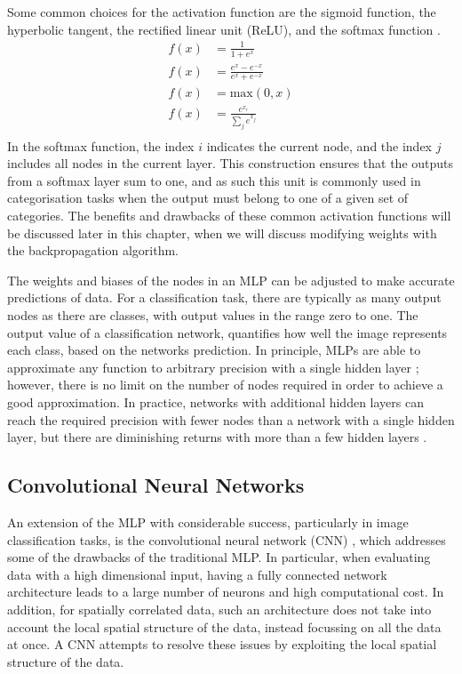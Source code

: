 Some common choices for the activation function are the sigmoid function, the
hyperbolic tangent, the rectified linear unit (ReLU), and the softmax function
\cite{Lecun2015, He2015, Szegedy2015}.
\begin{align}
	\tag{Sigmoid} f(x) &= \frac{1}{1+e^x} \\
	\tag{Tanh}    f(x) &= \frac{e^x - e^{-x}}{e^x+e^{-x}} \\
	\tag{ReLU}    f(x) &= \mbox{max}\left( 0, x \right) \\
	\tag{Softmax} f(x) &= \frac{e^{x_i}}{\sum_j e^{x_j}} \\
	\label{eqn:losses}
\end{align}
In the softmax function, the index $i$ indicates the current node, and the index
$j$ includes all nodes in the current layer. This construction ensures that 
the outputs from a softmax layer sum to one, and as such this unit is commonly 
used in categorisation tasks when the output must belong to one of a given set 
of categories. The benefits and drawbacks of these common activation functions 
will be discussed later in this chapter, when we will discuss modifying 
weights with the backpropagation algorithm.

The weights and biases of the nodes in an MLP can be adjusted to make accurate 
predictions of data. For a classification task, there are typically as many
output nodes as there are classes, with output values in the range zero to one. 
The output value of a classification network, quantifies how well the image
represents each class, based on the networks prediction. In principle, MLPs 
are able to approximate any function to arbitrary precision with a 
single hidden layer \cite{Cybenko1989ApproximationBS}; however, there is no 
limit on the number of nodes required in order to achieve a good 
approximation. In practice, networks with additional hidden layers can reach 
the required precision with fewer nodes than a network with a single hidden 
layer, but there are diminishing returns with more than a few hidden layers 
\cite{Reed1999, Lecun2015}.

\subsection{Convolutional Neural Networks}
An extension of the MLP with considerable success, particularly in image 
classification tasks, is the convolutional neural network (CNN) 
\cite{Jackel2008, Szegedy2015, 5537907}, which addresses some of the drawbacks 
of the traditional MLP. In particular, when evaluating data with a high 
dimensional input, having a fully connected network architecture leads to a 
large number of neurons and high computational cost. In addition, for 
spatially correlated data, such an architecture does not take into account the 
local spatial structure of the data, instead focussing on all the data at 
once. A CNN attempts to resolve these issues by exploiting the local spatial 
structure of the data.

